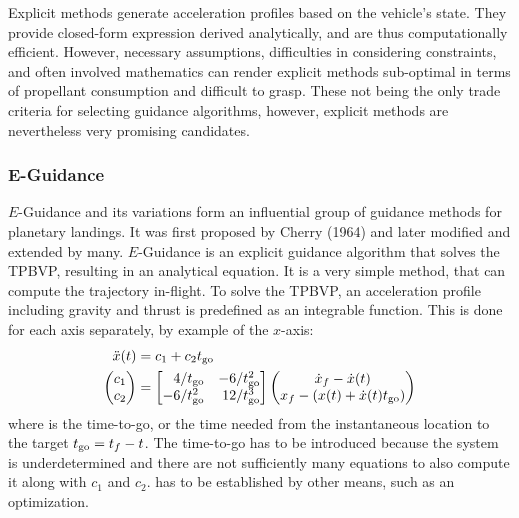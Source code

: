 \documentclass[%
]{aiaa-tc}
\begin{document}
Explicit methods generate acceleration profiles based on the vehicle's state.
They provide closed-form expression derived analytically, and are thus
computationally efficient. However, necessary assumptions, difficulties in
considering constraints, and often involved mathematics can render explicit
methods sub-optimal in terms of propellant consumption and difficult to grasp.
These not being the only trade criteria for selecting guidance algorithms, however,
explicit methods are nevertheless very promising candidates.


\subsubsection{E-Guidance}
\label{sec:eguidancepreview}

$E$-Guidance and its variations form an influential group of gui\-dance
\-me\-thods for planetary landings. It was first proposed by Cherry (1964) and
later modified and extended by many.\cite{Cherry1964} $E$-Guidance is an
explicit guidance algorithm that solves the TPBVP, resulting in an analytical
equation. It is a very simple method, that can compute the trajectory in-flight.
To solve the TPBVP, an acceleration profile including gravity and thrust is
predefined as an integrable function.  This is done for each axis separately, by
example of the $x$-axis:\cite{Cherry1964a} 
\begin{align}
	\ddot{x}(t) &= c_1 + c_2 \tgo \\
	\begin{pmatrix}
	c_1 \\ c_2
	\end{pmatrix}
    &= \begin{bmatrix*}[r]
		 4/\tgo    & -6/\tgo^2\\
		-6/\tgo^2  & 12/\tgo^3
	  \end{bmatrix*}
	  \begin{pmatrix}
	  	\dot{x}_f - \dot{x}(t)\\
	  	x_f  - (x(t) + \dot x(t) \tgo)	  	
	  \end{pmatrix} \label{eqn:egcoeffs}
\end{align}
where \tgo is the time-to-go, or the time needed from the instantaneous location
to the target $t_{\text{go}}=t_f - t$. The time-to-go has to be introduced because the
system is underdetermined and there are not sufficiently many equations to also
compute it along with $c_1$ and $c_2$. \tgo has to be established by other
means, such as an optimization.
\end{document}
